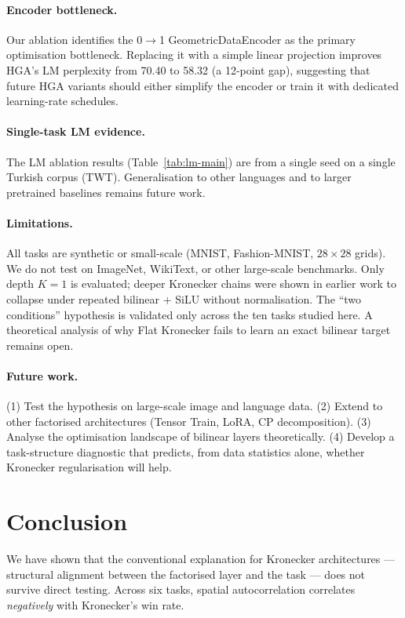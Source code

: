 \documentclass[11pt,a4paper]{article}
\begin{document}
\paragraph{Encoder bottleneck.}
Our ablation identifies the 0$\to$1 GeometricDataEncoder as the
primary optimisation bottleneck. Replacing it with a simple linear
projection improves HGA's LM perplexity from 70.40 to 58.32 (a 12-point
gap), suggesting that future HGA variants should either simplify the
encoder or train it with dedicated learning-rate schedules.

\paragraph{Single-task LM evidence.}
The LM ablation results (Table~\ref{tab:lm-main}) are from a single
seed on a single Turkish corpus (TWT). Generalisation to other
languages and to larger pretrained baselines remains future work.

\paragraph{Limitations.}
All tasks are synthetic or small-scale (MNIST, Fashion-MNIST,
$28 \times 28$ grids). We do not test on ImageNet, WikiText, or
other large-scale benchmarks. Only depth $K=1$ is evaluated;
deeper Kronecker chains were shown in earlier work to collapse
under repeated bilinear + SiLU without normalisation. The
``two conditions'' hypothesis is validated only across the ten
tasks studied here. A theoretical analysis of why Flat Kronecker
fails to learn an exact bilinear target remains open.

\paragraph{Future work.}
(1) Test the hypothesis on large-scale image and language data.
(2) Extend to other factorised architectures (Tensor Train, LoRA,
CP decomposition). (3) Analyse the optimisation landscape of
bilinear layers theoretically. (4) Develop a task-structure
diagnostic that predicts, from data statistics alone, whether
Kronecker regularisation will help.


\section{Conclusion}
\label{sec:conclusion}

We have shown that the conventional explanation for Kronecker
architectures --- structural alignment between the factorised
layer and the task --- does not survive direct testing. Across
six tasks, spatial autocorrelation correlates \emph{negatively}
with Kronecker's win rate.
\end{document}
